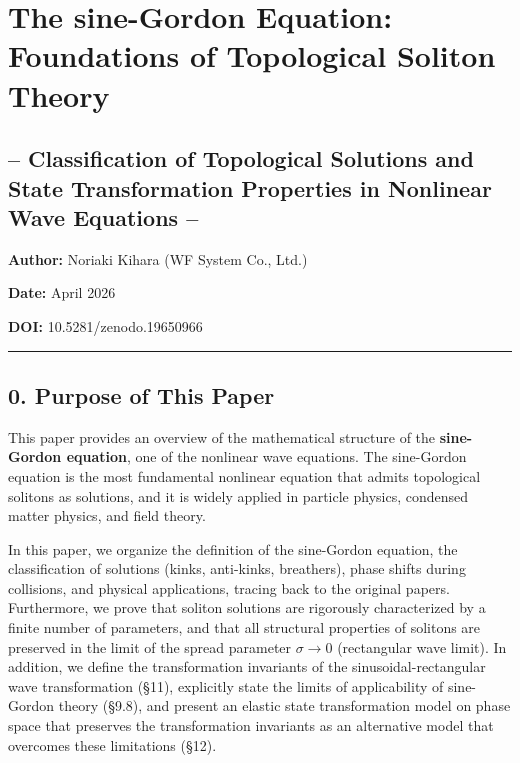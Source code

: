 \documentclass[a4paper,11pt]{article}
\begin{document}
\section{The sine-Gordon Equation: Foundations of Topological Soliton
Theory}\label{the-sine-gordon-equation-foundations-of-topological-soliton-theory}

\subsection{-- Classification of Topological Solutions and State
Transformation Properties in Nonlinear Wave Equations
--}\label{classification-of-topological-solutions-and-state-transformation-properties-in-nonlinear-wave-equations}

\textbf{Author:} Noriaki Kihara (WF System Co., Ltd.)

\textbf{Date:} April 2026

\textbf{DOI:} 10.5281/zenodo.19650966

\begin{center}\rule{0.5\linewidth}{0.5pt}\end{center}

\subsection{0. Purpose of This Paper}\label{purpose-of-this-paper}

This paper provides an overview of the mathematical structure of the
\textbf{sine-Gordon equation}, one of the nonlinear wave equations. The
sine-Gordon equation is the most fundamental nonlinear equation that
admits topological solitons as solutions, and it is widely applied in
particle physics, condensed matter physics, and field theory.

In this paper, we organize the definition of the sine-Gordon equation,
the classification of solutions (kinks, anti-kinks, breathers), phase
shifts during collisions, and physical applications, tracing back to the
original papers. Furthermore, we prove that soliton solutions are
rigorously characterized by a finite number of parameters, and that all
structural properties of solitons are preserved in the limit of the
spread parameter \(\sigma \to 0\) (rectangular wave limit). In addition,
we define the transformation invariants of the sinusoidal-rectangular
wave transformation (§11), explicitly state the limits of applicability
of sine-Gordon theory (§9.8), and present an elastic state
transformation model on phase space that preserves the transformation
invariants as an alternative model that overcomes these limitations
(§12).
\end{document}

